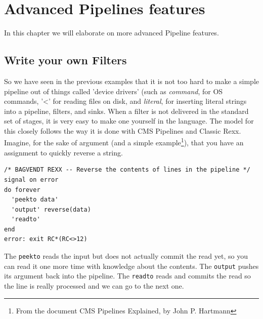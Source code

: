 
\chapter{Advanced Pipelines features}

In this chapter we will elaborate on more advanced Pipeline features.

\section{Write your own Filters}
So we have seen in the previous examples that it is not too hard to
make a simple pipeline out of things called 'device drivers' (such as
\emph{command}, for OS commands, '<' for reading files on disk, and
\emph{literal}, for inserting literal strings into a pipeline,
filters, and sinks.
When a filter is not delivered in the standard set of stages, it is
very easy to make one yourself in the \nr{} language. The model for
this closely follows the way it is done with CMS Pipelines and Classic
Rexx.
Imagine, for the sake of argument (and a simple example\footnote{From
the document CMS Pipelines Explained, by John P. Hartmann}), that you have an
assignment to quickly reverse a string.
\begin{lstlisting}
/* BAGVENDT REXX -- Reverse the contents of lines in the pipeline */
signal on error
do forever
  'peekto data'
  'output' reverse(data)
  'readto'
end
error: exit RC*(RC<>12)
\end{lstlisting}
The \texttt{peekto} reads the input but does not actually commit the read yet,
so you can read it one more time with knowledge about the contents.
The \texttt{output} pushes its argument back into the pipeline.
The \texttt{readto} reads and commits the read so the line is really processed
and we can go to the next one.

